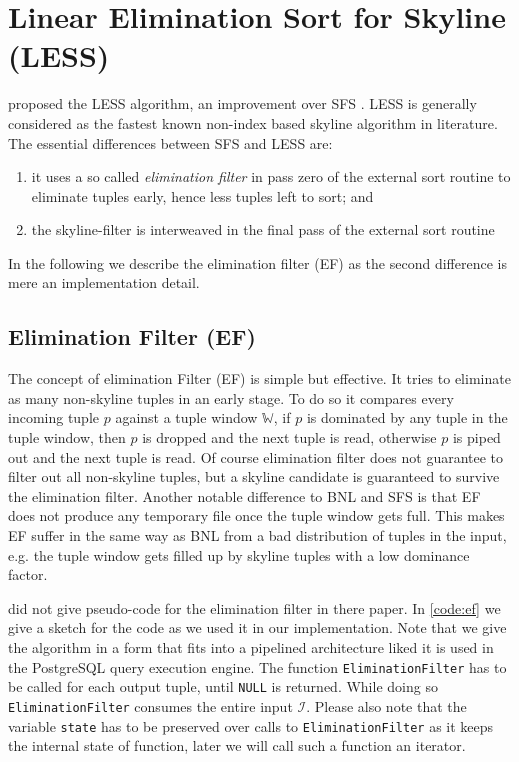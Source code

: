 \section{Linear Elimination Sort for Skyline (LESS)}
\citet{Godfrey2005} proposed the LESS algorithm, an improvement
over SFS \citep{Chomicki2003}. LESS is generally considered as the fastest
known non-index based skyline algorithm in literature. The essential
differences between SFS and LESS are:

\begin{enumerate}
\item 
it uses a so called \emph{elimination filter} in pass zero of the
external sort routine to eliminate tuples early, hence less tuples left
to sort; and
\item
the skyline-filter is interweaved in the final pass of the external
sort routine
\end{enumerate}

In the following we describe the elimination filter (EF) as the second
difference is mere an implementation detail.

\subsection{Elimination Filter (EF)}
\label{sec:ef-tuple-order}
The concept of elimination Filter (EF) is simple but effective.  It
tries to eliminate as many non-skyline tuples in an early stage.  To
do so it compares every incoming tuple $p$ against a tuple window
$\mathbb{W}$, if $p$ is dominated by any tuple in the tuple window,
then $p$ is dropped and the next tuple is read, otherwise $p$ is piped
out and the next tuple is read.  Of course elimination filter does not
guarantee to filter out all non-skyline tuples, but a skyline candidate
is guaranteed to survive the elimination filter.  Another notable
difference to BNL and SFS is that EF does not produce any temporary
file once the tuple window gets full.  This makes EF suffer in the
same way as BNL from a bad distribution of tuples in the input, e.g.
the tuple window gets filled up by skyline tuples with a low dominance
factor.

\citet{Godfrey2005} did not give pseudo-code for the elimination
filter in there paper. In \autoref{code:ef} we give a sketch for
the code as we used it in our implementation. Note that we give
the algorithm in a form that fits into a pipelined architecture liked
it is used in the PostgreSQL query execution engine. The function
\texttt{EliminationFilter} has to be called for each output tuple,
until \texttt{NULL} is returned. While doing so
\texttt{EliminationFilter} consumes the entire input $\mathcal{I}$.
Please also note that the variable \texttt{state} has to be preserved
over calls to \texttt{EliminationFilter} as it keeps the internal
state of function, later we will call such a function an iterator.


